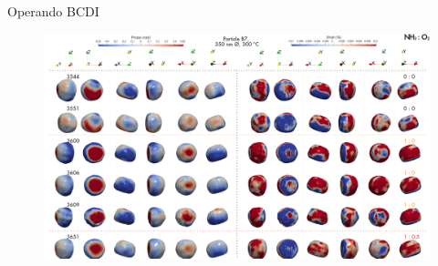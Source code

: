 \begin{frame}{Operando BCDI}

    \begin{figure}
        \centering
        \includegraphics[width=\textwidth]{Figures/bcdi_data/OperandoBCDI.png}
    \end{figure}
    
\end{frame}